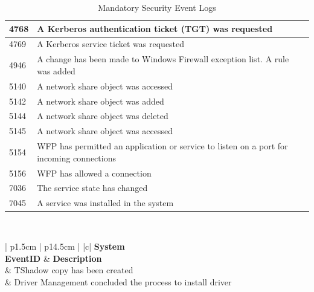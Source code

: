 \begin{table}[H]
\begin{tabular}{| p{1.5cm} | p{14.5cm} |}
        4768 & A Kerberos authentication ticket (TGT) was requested \\ \hline
        4769 & A Kerberos service ticket was requested \\ \hline
        4946 & A change has been made to Windows Firewall exception list. A rule was added \\ \hline
        5140 & A network share object was accessed \\ \hline
        5142 & A network share object was added \\ \hline
        5144 & A network share object was deleted \\ \hline
        5145 & A network share object was accessed \\ \hline
        5154 & WFP has permitted an application or service to listen on a port for incoming connections \\ \hline
        5156 & WFP has allowed a connection \\ \hline
        7036\footnotemark[1] & The service state has changed \\ \hline
        7045\footnotemark[1] & A service was installed in the system \\ \hline
    \end{tabular}
    \caption{Mandatory Security Event Logs}
\end{table}

\clearpage
\
\vspace{0.5cm}
\begin{table}[H]
    \centering
    \begin{tabular}{| p{1.5cm} | p{14.5cm} |} \hline
         {|c|} {\tiny\bfseries System} \\ \hline
        \textbf{EventID} & \textbf{Description}  \\ \footnotemark[1] & TShadow copy has been created \\ \hline
        20001\footnotemark[1] & Driver Management concluded the process to install driver  \\ \hline
    \end{tabular}
    \caption{Mandatory System Event Logs}
\end{table}

